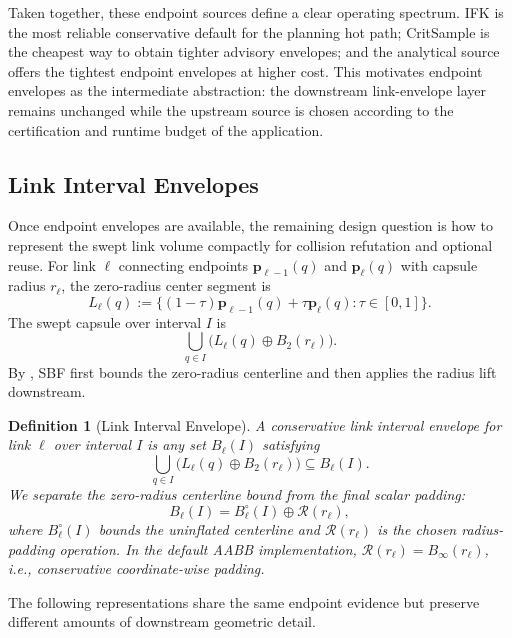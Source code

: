 \documentclass[journal]{IEEEtran}
\DeclareRobustCommand{\textsc}[1]{\textnormal{\MakeUppercase{#1}}}
\newtheorem{definition}{Definition}
\newcommand{\sbf}{\textsc{SBF}}
\begin{document}
Taken together, these endpoint sources define a clear operating spectrum. IFK
is the most reliable conservative default for the planning hot path; CritSample is
the cheapest way to obtain tighter advisory envelopes; and the analytical
source offers the tightest endpoint envelopes at higher cost.
This motivates endpoint envelopes as the intermediate abstraction: the
downstream link-envelope layer remains unchanged while the upstream source is
chosen according to the certification and runtime budget of the application.

\subsection{Link Interval Envelopes}\label{sec:rewrite_link_env}

Once endpoint envelopes are available, the remaining design question is how to
represent the swept link volume compactly for collision refutation and optional
reuse. For link $\ell$ connecting endpoints $\bm{p}_{\ell-1}(q)$ and
$\bm{p}_{\ell}(q)$ with capsule radius $r_\ell$, the zero-radius center segment
is
\[
L_\ell(q) := \{(1-\tau)\bm{p}_{\ell-1}(q) + \tau \bm{p}_{\ell}(q) :
\tau \in [0,1]\}.
\]
The swept capsule over interval $I$ is
\[
\bigcup_{q\in I} \bigl(L_\ell(q) \oplus B_2(r_\ell)\bigr).
\]
By , \sbf{} first bounds the zero-radius centerline and
then applies the radius lift downstream.

\begin{definition}[Link Interval Envelope]\label{def:link_interval_env}
A conservative link interval envelope for link $\ell$ over interval $I$ is any
set $B_\ell(I)$ satisfying
\[
\bigcup_{q\in I} \bigl(L_\ell(q) \oplus B_2(r_\ell)\bigr) \subseteq B_\ell(I).
\]
We separate the zero-radius centerline bound from the final scalar padding:
\[
B_\ell(I) = B_\ell^{\circ}(I) \oplus \mathcal{R}(r_\ell),
\]
where $B_\ell^{\circ}(I)$ bounds the uninflated centerline and
$\mathcal{R}(r_\ell)$ is the chosen radius-padding operation. In the default
AABB implementation, $\mathcal{R}(r_\ell)=B_\infty(r_\ell)$, i.e., conservative
coordinate-wise padding.
\end{definition}

The following representations share the same endpoint evidence but preserve
different amounts of downstream geometric detail.
\end{document}
